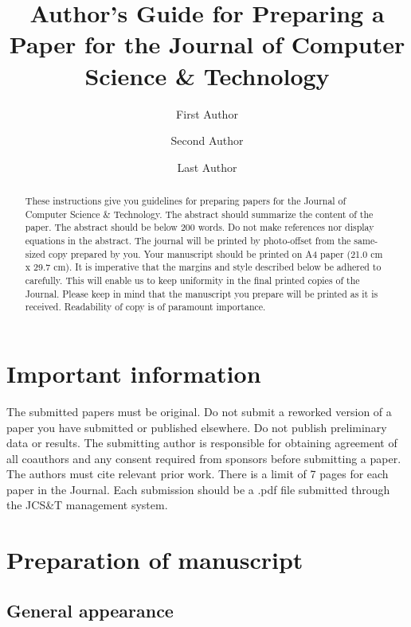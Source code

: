 \documentclass{jcst}
\title{Author's Guide for Preparing a Paper for the Journal of Computer Science \& Technology}
\author[1,2]{First Author}
\author[2]{Second Author}
\author[1]{Last Author}
\affil[1]{University Department, University Name, City, State ZIP/Zone, Country \authorcr
\{firstauthor, lastauthor\}@mail.dom }
\affil[2]{Group, Company, City, State ZIP/Zone, Country  \authorcr
\{secondauthor\}@mail.dom}
\begin{document}
\maketitle

\begin{abstract}
These instructions give you guidelines for preparing papers for the
Journal of Computer Science \& Technology. The abstract should summarize the
 content of the paper. The abstract should be below 200 words. Do not make
  references nor display equations in the abstract. The journal will be printed
  by photo-offset from the same-sized copy prepared by you. Your manuscript
   should be printed on A4 paper (21.0 cm x 29.7 cm). It is imperative that the
 margins and style described below be adhered to carefully. This will enable
 us to keep uniformity in the final printed copies of the Journal. Please
 keep in mind that the manuscript you prepare will be printed as it is received. 
 Readability of copy is of paramount importance.
\end{abstract}



\section{Important information}

The submitted papers must be original. Do not submit a reworked version of a paper you
have submitted or published elsewhere. Do not publish preliminary data or results.
The submitting author is responsible for obtaining agreement of all coauthors and
any consent required from sponsors before submitting a paper. The authors must
 cite relevant prior work.
There is a limit of 7 pages for each paper in the Journal. Each submission should
be a .pdf file submitted through the JCS\&T management system.

\section{Preparation of manuscript}

\subsection{General appearance}
\end{document}
